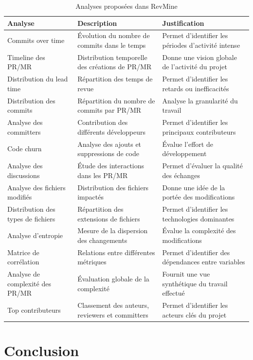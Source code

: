 \begin{table}[H]
\centering
\begin{tabular}{|p{4cm}|p{5cm}|p{6cm}|}
\hline
\textbf{Analyse} & \textbf{Description} & \textbf{Justification} \\
\hline
Commits over time & Évolution du nombre de commits dans le temps & Permet d’identifier les périodes d’activité intense \\
\hline
Timeline des PR/MR & Distribution temporelle des créations de PR/MR & Donne une vision globale de l’activité du projet \\
\hline
Distribution du lead time & Répartition des temps de revue & Permet d’identifier les retards ou inefficacités \\
\hline
Distribution des commits & Répartition du nombre de commits par PR/MR & Analyse la granularité du travail \\
\hline
Analyse des committers & Contribution des différents développeurs & Permet d’identifier les principaux contributeurs \\
\hline
Code churn & Analyse des ajouts et suppressions de code & Évalue l’effort de développement \\
\hline
Analyse des discussions & Étude des interactions dans les PR/MR & Permet d’évaluer la qualité des échanges \\
\hline
Analyse des fichiers modifiés & Distribution des fichiers impactés & Donne une idée de la portée des modifications \\
\hline
Distribution des types de fichiers & Répartition des extensions de fichiers & Permet d’identifier les technologies dominantes \\
\hline
Analyse d’entropie & Mesure de la dispersion des changements & Évalue la complexité des modifications \\
\hline
Matrice de corrélation & Relations entre différentes métriques & Permet d’identifier des dépendances entre variables \\
\hline
Analyse de complexité des PR/MR & Évaluation globale de la complexité & Fournit une vue synthétique du travail effectué \\
\hline
Top contributeurs & Classement des auteurs, reviewers et committers & Permet d’identifier les acteurs clés du projet \\
\hline
\end{tabular}
\caption{Analyses proposées dans RevMine}
\end{table}

\section{Conclusion}

